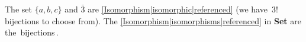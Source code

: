 
The set $\{a,b,c\}$ and $\bar{3}$ are \ref{Isomorphism|isomorphic|referenced} (we have \,$3!$\, bijections to choose from). The \ref{Isomorphism|isomorphisms|referenced} in \textbf{Set} are the \,bijections\,.
